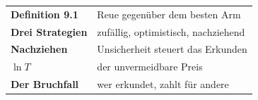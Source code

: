 \begin{merksatz}
\begin{center}
\renewcommand{\arraystretch}{1.5}
\begin{tabular}{@{}P{3.0cm}P{5.6cm}@{}}
\toprule
\textbf{Definition 9.1} & Reue gegenüber dem besten Arm\\
\textbf{Drei Strategien} & zufällig, optimistisch, nachziehend\\
\textbf{Nachziehen} & Unsicherheit steuert das Erkunden\\
\textbf{$\ln T$} & der unvermeidbare Preis\\
\textbf{Der Bruchfall} & wer erkundet, zahlt für andere\\
\bottomrule
\end{tabular}
\end{center}

\begin{center}
\begin{minipage}{0.88\textwidth}
\end{minipage}
\end{center}
\end{merksatz}
